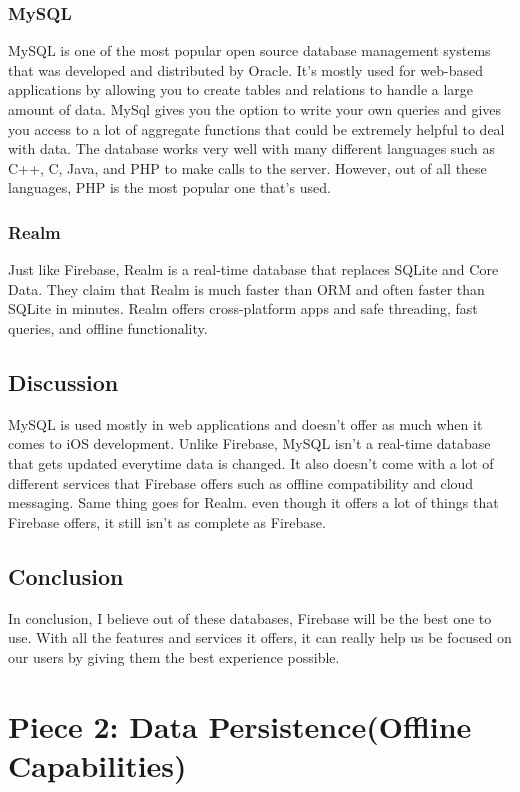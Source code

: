 \documentclass[onecolumn, draftclsnofoot,10pt, compsoc]{IEEEtran}
\begin{document}
\subsubsection{MySQL\cite{MySql}}
MySQL is one of the most popular open source database management systems that was developed and distributed by Oracle. It's mostly used for web-based applications by allowing you to create tables and relations to handle a large amount of data. MySql gives you the option to write your own queries and gives you access to a lot of aggregate functions that could be extremely helpful to deal with data. The database works very well with many different languages such as C++, C, Java, and PHP to make calls to the server. However, out of all these languages, PHP is the most popular one that's used.

\subsubsection{Realm\cite{Realm}}
Just like Firebase, Realm is a real-time database that replaces SQLite and Core Data. They claim that Realm is much faster than ORM and often faster than SQLite in minutes. Realm offers cross-platform apps and safe threading, fast queries, and offline functionality. 

\subsection{Discussion}
MySQL is used mostly in web applications and doesn't offer as much when it comes to iOS development. Unlike Firebase, MySQL isn't a real-time database that gets updated everytime data is changed. It also doesn't come with a lot of different services that Firebase offers such as offline compatibility and cloud messaging. Same thing goes for Realm. even though it offers a lot of things that Firebase offers, it still isn't as complete as Firebase. 

\subsection{Conclusion}
In conclusion, I believe out of these databases, Firebase will be the best one to use. With all the features and services it offers, it can really help us be focused on our users by giving them the best experience possible. 

\section{Piece 2: Data Persistence(Offline Capabilities)}
\end{document}

